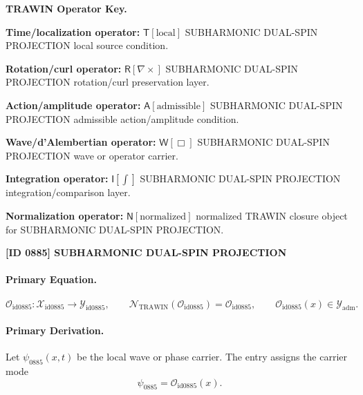 \par\vspace{0.45\baselineskip}
\noindent\begin{minipage}[t]{\linewidth}
\begingroup
\small
\raggedright
\textbf{TRAWIN Operator Key.}\par
\noindent\textbf{Time/localization operator:} $\mathsf{T}\!\left[\mathrm{local}\right]$ SUBHARMONIC DUAL-SPIN PROJECTION local source condition.\par
\noindent\textbf{Rotation/curl operator:} $\mathsf{R}\!\left[\nabla\times\right]$ SUBHARMONIC DUAL-SPIN PROJECTION rotation/curl preservation layer.\par
\noindent\textbf{Action/amplitude operator:} $\mathsf{A}\!\left[\mathrm{admissible}\right]$ SUBHARMONIC DUAL-SPIN PROJECTION admissible action/amplitude condition.\par
\noindent\textbf{Wave/d'Alembertian operator:} $\mathsf{W}\!\left[\Box\right]$ SUBHARMONIC DUAL-SPIN PROJECTION wave or operator carrier.\par
\noindent\textbf{Integration operator:} $\mathsf{I}\!\left[\int\right]$ SUBHARMONIC DUAL-SPIN PROJECTION integration/comparison layer.\par
\noindent\textbf{Normalization operator:} $\mathsf{N}\!\left[\mathrm{normalized}\right]$ normalized TRAWIN closure object for SUBHARMONIC DUAL-SPIN PROJECTION.\par
\endgroup
\end{minipage}

\clearpage
\noindent\textbf{[ID 0885] SUBHARMONIC DUAL-SPIN PROJECTION}\par
\vspace{0.35em}
\paragraph{Primary Equation.}
\[
\mathcal{O}_{\mathrm{id0885}}:\mathcal{X}_{\mathrm{id0885}}\longrightarrow \mathcal{Y}_{\mathrm{id0885}},\qquad
\mathcal{N}_{\mathrm{TRAWIN}}(\mathcal{O}_{\mathrm{id0885}})=\mathcal{O}_{\mathrm{id0885}},\qquad
\mathcal{O}_{\mathrm{id0885}}(x)\in\mathcal{Y}_{\mathrm{adm}}.
\]

\paragraph{Primary Derivation.} Let $\psi_{0885}(x,t)$ be the local wave or phase carrier.  The entry assigns the carrier mode\[
\psi_{0885}=\mathcal{O}_{\mathrm{id0885}}(x).
\]

